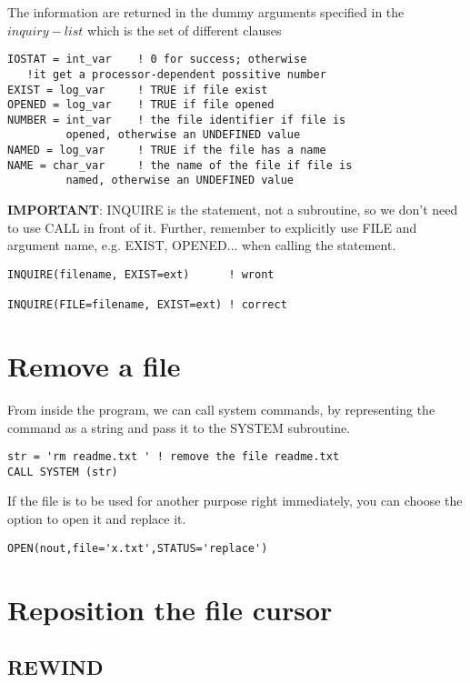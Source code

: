 The information are returned in the dummy arguments specified in the
$inquiry-list$ which is the set of different clauses
\begin{lstlisting}
IOSTAT = int_var    ! 0 for success; otherwise 
   !it get a processor-dependent possitive number 
EXIST = log_var     ! TRUE if file exist
OPENED = log_var    ! TRUE if file opened
NUMBER = int_var    ! the file identifier if file is 
         opened, otherwise an UNDEFINED value
NAMED = log_var     ! TRUE if the file has a name
NAME = char_var     ! the name of the file if file is 
         named, otherwise an UNDEFINED value
\end{lstlisting}

{\bf IMPORTANT}: INQUIRE is the statement, not a subroutine, so we don't
need to use CALL in front of it. Further, remember to explicitly use
FILE and argument name, e.g. EXIST, OPENED... when calling the
statement. 
\begin{lstlisting}
INQUIRE(filename, EXIST=ext)      ! wront

INQUIRE(FILE=filename, EXIST=ext) ! correct
\end{lstlisting}


\section{Remove a file}
\label{sec:remove-file}

From inside the program, we can call system commands, by representing the
command as a string and pass it to the SYSTEM subroutine.

\begin{lstlisting}
str = 'rm readme.txt ' ! remove the file readme.txt
CALL SYSTEM (str)
\end{lstlisting}

If the file is to be used for another purpose right immediately, you
can choose the option to open it and replace it.
\begin{lstlisting}
OPEN(nout,file='x.txt',STATUS='replace')
\end{lstlisting}

\section{Reposition the file cursor}
\label{sec:repos-file-curs}

\subsection{REWIND}
\label{sec:rewind}


